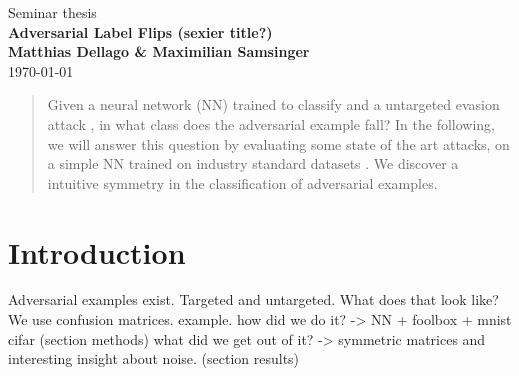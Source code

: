 \documentclass{article}
\begin{document}
\begin{titlepage}
	\noindent{}
	\vspace{3cm}
	\begin{center}
		{\Large Seminar thesis}
		\vspace{50pt}\\
		\textbf{\Huge Adversarial Label Flips (sexier title?)}
		\vspace{40pt}\\
		\textbf{\Large Matthias Dellago \& Maximilian Samsinger}\vspace{20pt}\\
		{\large\today}
		\vspace{120pt}
	\end{center}
\end{titlepage}
	
	\DeclarePairedDelimiter\abs{\lvert}{\rvert}%
	\DeclarePairedDelimiter\norm{\lVert}{\rVert}%
	\DeclarePairedDelimiter\ceil{\lceil}{\rceil}
	\DeclarePairedDelimiter\floor{\lfloor}{\rfloor}
	
\begin{abstract}
	
	Given a neural network (NN) trained to classify and a untargeted evasion attack \cite{}, in what class does the adversarial example fall?
	In the following, we will answer this question by evaluating some state of the art attacks, on a simple NN trained on industry standard datasets \cite{mnist, fashion,mnist, cifar10}.
	We discover a intuitive symmetry in the classification of adversarial examples.
\end{abstract}

\section{Introduction}

Adversarial examples exist.
Targeted and untargeted.
What does that look like?
We use confusion matrices.
example.
how did we do it? -> NN + foolbox + mnist cifar (section methods)
what did we get out of it? -> symmetric matrices and interesting insight about noise. (section results)
\end{document}
